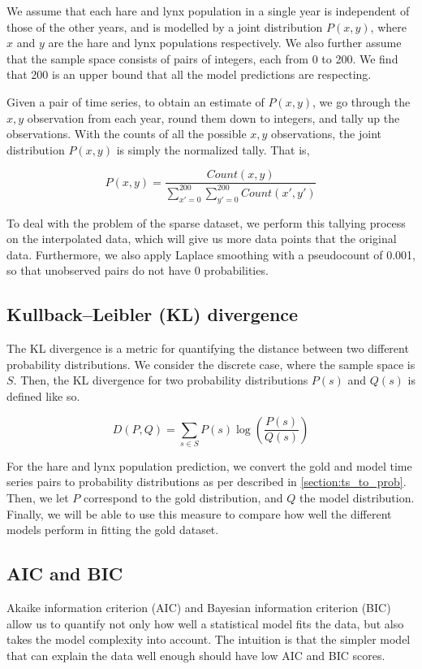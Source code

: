 \documentclass[letterpaper, 10 pt, conference]{ieeeconf}  %
\begin{document}
We assume that each hare and lynx population in a single year is independent of those of the other years, and is modelled by a joint distribution $P(x, y)$, where $x$ and $y$ are the hare and lynx populations respectively. We also further assume that the sample space consists of pairs of integers, each from 0 to 200. We find that 200 is an upper bound that all the model predictions are respecting.

Given a pair of time series, to obtain an estimate of $P(x, y)$, we go through the $x, y$ observation from each year, round them down to integers, and tally up the observations. With the counts of all the possible $x, y$ observations, the joint distribution $P(x, y)$ is simply the normalized tally. That is,

\begin{equation}
P(x,y) = \frac{Count(x,y)}{\sum_{x'=0}^{200} \sum_{y'=0}^{200} Count(x', y')}    
\end{equation}

To deal with the problem of the sparse dataset, we perform this tallying process on the interpolated data, which will give us more data points that the original data. Furthermore, we also apply Laplace smoothing with a pseudocount of 0.001, so that unobserved pairs do not have 0 probabilities.

\subsection{Kullback–Leibler (KL) divergence}
\label{section:kl_div}
The KL divergence is a metric for quantifying the distance between two different probability distributions. We consider the discrete case, where the sample space is $S$. Then, the KL divergence for two probability distributions $P(s)$ and $Q(s)$ is defined like so.

\begin{equation}
D(P, Q) = \sum_{s \in S} P(s) \log(\frac{P(s)}{Q(s)})
\end{equation}

For the hare and lynx population prediction, we convert the gold and model time series pairs to probability distributions as per described in \ref{section:ts_to_prob}. Then, we let $P$ correspond to the gold distribution, and $Q$ the model distribution. Finally, we will be able to use this measure to compare how well the different models perform in fitting the gold dataset.

\subsection{AIC and BIC}
\label{section:aic_bic}
Akaike information criterion (AIC) and Bayesian information criterion (BIC) allow us to quantify not only how well a statistical model fits the data, but also takes the model complexity into account. The intuition is that the simpler model that can explain the data well enough should have low AIC and BIC scores.
\end{document}
